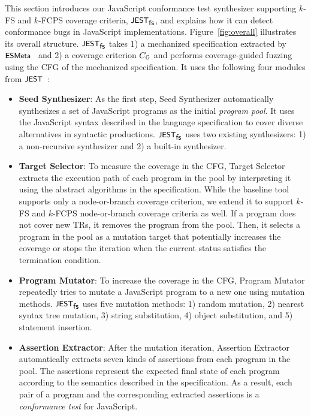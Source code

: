 This section introduces our JavaScript
conformance test synthesizer supporting $k$-FS and $k$-FCPS coverage criteria,
$\textsf{\small JEST}_{\textsf{\small fs}}$, and explains how it can detect conformance bugs in JavaScript implementations.
Figure~\ref{fig:overall} illustrates its overall structure.
$\textsf{\small JEST}_{\textsf{\small fs}}$ takes 1) a mechanized specification extracted by $\textsf{\small ESMeta}$~\cite{esmeta}
and 2) a coverage criterion $C_{\mathbb{G}}$ and performs
coverage-guided fuzzing~\cite{afl} using the CFG of the mechanized specification.
It uses the following four modules from $\textsf{\small JEST}$~\cite{jest}:
\begin{itemize}
  \item \textsf{\textbf{Seed Synthesizer}}:
    As the first step, \textsf{Seed Synthesizer} automatically synthesizes a set
    of JavaScript programs as the initial \textit{program pool}.
    It uses the JavaScript syntax described in the language specification to
    cover diverse alternatives in syntactic productions.
    $\textsf{\small JEST}_{\textsf{\small fs}}$ uses two existing synthesizers: 1) a non-recursive synthesizer and
    2) a built-in synthesizer.
  \item \textsf{\textbf{Target Selector}}:
    To measure the coverage in the CFG, \textsf{Target Selector} extracts the
    execution path of each program in the pool by interpreting it using the
    abstract algorithms in the specification.
    While the baseline tool supports only a node-or-branch coverage criterion,
    we extend it to support $k$-FS and $k$-FCPS node-or-branch coverage
    criteria as well.
    If a program does not cover new TRs, it removes the program from the pool.
    Then, it selects a program in the pool as a mutation target that potentially
    increases the coverage or stops the iteration when the current status
    satisfies the termination condition.
  \item \textsf{\textbf{Program Mutator}}:
    To increase the coverage in the CFG, \textsf{Program Mutator} repeatedly
    tries to mutate a JavaScript program to a new one using mutation methods.
    $\textsf{\small JEST}_{\textsf{\small fs}}$ uses five mutation methods: 1) random mutation, 2)
    nearest syntax tree mutation, 3) string substitution, 4) object
    substitution, and 5) statement insertion.
  \item \textsf{\textbf{Assertion Extractor}}:
    After the mutation iteration, \textsf{Assertion Extractor} automatically
    extracts seven kinds of assertions from each program in the pool.
    The assertions represent the expected final state of each program according
    to the semantics described in the specification.
    As a result, each pair of a program and the corresponding extracted
    assertions is a \textit{conformance test} for JavaScript.
\end{itemize}

